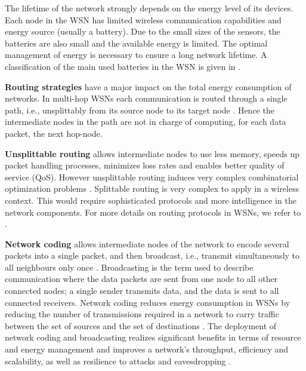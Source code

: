 The lifetime of the network strongly depends on the energy level of its devices. Each node in the WSN has limited wireless communication capabilities and energy source (usually a battery). Due to the small sizes of the sensors, the batteries are also small and the available energy is limited. The optimal management of energy is necessary to ensure a long network lifetime. A classification of the main used batteries in the WSN is given in \cite{tiliute2007battery}.

\textbf{Routing strategies} have a major impact on the total energy consumption of networks. In multi-hop WSNs each communication is routed through a single path, i.e., unsplittably from its source node to its target node \cite{baccelli2009,baccelli2010optimization, baccelli2010ospf}. Hence the intermediate nodes in the path are not in charge of computing, for each data packet, the next hop-node.

\textbf{Unsplittable routing} allows intermediate nodes to use less memory, speeds up packet handling processes, minimizes loss rates and enables better quality of service (QoS). However unsplittable routing induces very complex combinatorial optimization problems \cite{barnhart1998branch,BelaidouniB07, kleinberg1996single,vanier2018partition}. Splittable routing is very complex to apply in a wireless context. This would require sophisticated protocols and more intelligence in the network components. For more details on routing protocols in WSNs, we refer to \cite{cordero2011link}.

\textbf{Network coding} allows intermediate nodes of the network to encode several packets into a single packet, and then broadcast, i.e., transmit simultaneously to all neighbours only once \cite{nguyen2008wireless}. Broadcasting is the term used to describe communication where the data packets are sent from one node to all other connected nodes; a single sender transmits data, and the data is sent to all connected receivers. 
Network coding reduces energy consumption in WSNs by reducing the number of transmissions required in a network to carry traffic between the set of sources and the set of destinations \cite{abdul2017efficient, rhaiem2017information, cheng2019high,  jacquet2001optimized, li2003linear}.
The deployment of network coding and broadcasting realizes significant benefits in terms of resource and energy management and improves a network's throughput, efficiency and scalability, as well as resilience to attacks and eavesdropping \cite{Fragouli2008}.

